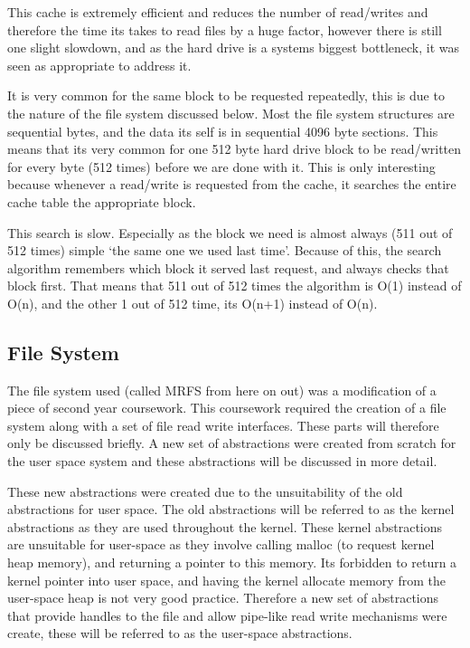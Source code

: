 \documentclass[a4paper]{report}
\begin{document}
This cache is extremely efficient and reduces the number of read/writes and therefore the time its takes to read files by a huge factor, however there is still one slight slowdown, and as the hard drive is a systems biggest bottleneck, it was seen as appropriate to address it.

It is very common for the same block to be requested repeatedly, this is due to the nature of the file system discussed below. Most the file system structures are sequential bytes, and the data its self is in sequential 4096 byte sections. This means that its very common for one 512 byte hard drive block to be read/written for every byte (512 times) before we are done with it. This is only interesting because whenever a read/write is requested from the cache, it searches the entire cache table the appropriate block.

This search is slow. Especially as the block we need is almost always (511 out of 512 times) simple `the same one we used last time'. Because of this, the search algorithm remembers which block it served last request, and always checks that block first. That means that 511 out of 512 times the algorithm is O(1) instead of O(n), and the other 1 out of 512 time, its O(n+1) instead of O(n).


























\subsection{File System}

The file system used (called MRFS from here on out) was a modification of a piece of second year coursework. This coursework required the creation of a file system along with a set of file read write interfaces. These parts will therefore only be discussed briefly. A new set of abstractions were created from scratch for the user space system and these abstractions will be discussed in more detail.

These new abstractions were created due to the unsuitability of the old abstractions for user space. The old abstractions will be referred to as the kernel abstractions as they are used throughout the kernel. These kernel abstractions are unsuitable for user-space as they involve calling malloc (to request kernel heap memory), and returning a pointer to this memory. Its forbidden to return a kernel pointer into user space, and having the kernel allocate memory from the user-space heap is not very good practice. Therefore a new set of abstractions that provide handles to the file and allow pipe-like read write mechanisms were create, these will be referred to as the user-space abstractions.
\end{document}
